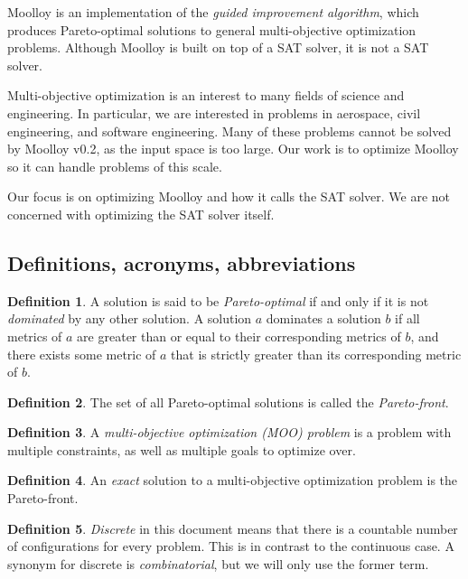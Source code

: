 \documentclass[11pt]{article}
\theoremstyle{definition}
\newtheorem{mydef}{Definition}
\begin{document}
Moolloy is an implementation of the \textit{guided improvement
algorithm}, which produces Pareto-optimal solutions to general
multi-objective optimization problems. Although Moolloy is built on top
of a SAT solver, it is not a SAT solver.

Multi-objective optimization is an interest to many fields of science
and engineering. In particular, we are interested in problems in
aerospace, civil engineering, and software engineering. Many of these
problems cannot be solved by Moolloy v0.2, as the input space is too
large. Our work is to optimize Moolloy so it can handle problems of
this scale.

Our focus is on optimizing Moolloy and how it calls the SAT solver. We
are not concerned with optimizing the SAT solver itself.

\subsection{Definitions, acronyms, abbreviations}

\begin{mydef}
A solution is said to be \textit{Pareto-optimal} if and only if it is
not \textit{dominated} by any other solution. A solution $a$ dominates
a solution $b$ if all metrics of $a$ are greater than or equal to their
corresponding metrics of $b$, and there exists some metric of $a$ that
is strictly greater than its corresponding metric of $b$.
\end{mydef}

\begin{mydef}
The set of all Pareto-optimal solutions is called the
\textit{Pareto-front}.
\end{mydef}

\begin{mydef}
A \textit{multi-objective optimization (MOO) problem} is a problem with
multiple constraints, as well as multiple goals to optimize over.
\end{mydef}

\begin{mydef}
An \textit{exact} solution to a multi-objective optimization problem is
the Pareto-front.
\end{mydef}

\begin{mydef}
\textit{Discrete} in this document means that there is a countable
number of configurations for every problem. This is in contrast to the
continuous case. A synonym for discrete is \textit{combinatorial}, but
we will only use the former term.  \end{mydef}
\end{document}
